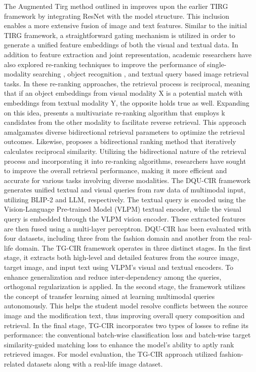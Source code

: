 \documentclass[10pt,lineno]{wlpeerj}
\begin{document}
\par The Augmented Tirg method outlined in \citep{aug-tirg} improves upon the earlier TIRG framework \citep{Nam} by integrating ResNet with the model structure. This inclusion enables a more extensive fusion of image and text features. Similar to the initial TIRG framework, a straightforward gating mechanism is utilized in order to generate a unified feature embeddings of both the visual and textual data. In addition to feature extraction and joint representation, academic researchers have also explored re-ranking techniques to improve the performance of single-modality searching \citep{SMR-1, SMR-2, SMR-3, SMR-4}, object recognition \citep{OR-1, OR-2}, and textual query based image retrieval \citep{TQ-1, TQ-2, TQ-3} tasks. In these re-ranking approaches, the retrieval process is reciprocal, meaning that if an object embeddings from visual modality X is a potential match with embeddings from textual modality Y, the opposite holds true as well. Expanding on this idea, \citep{RR} presents a multivariate re-ranking algorithm that employs k candidates from the other modality to facilitate reverse retrieval. This approach amalgamates diverse bidirectional retrieval parameters to optimize the retrieval outcomes. Likewise, \citep{SMR-2} proposes a bidirectional ranking method that iteratively calculates reciprocal similarity. Utilizing the bidirectional nature of the retrieval process and incorporating it into re-ranking algorithms, researchers have sought to improve the overall retrieval performance, making it more efficient and accurate for various tasks involving diverse modalities. The DQU-CIR \cite{DQU_CIR_Rev2} framework generates unified textual and visual queries from raw data of multimodal input, utilizing BLIP-2 and LLM, respectively. The textual query is encoded using the Vision-Language Pre-trained Model (VLPM) textual encoder, while the visual query is embedded through the VLPM vision encoder. These extracted features are then fused using a multi-layer perceptron. DQU-CIR has been evaluated with four datasets, including three from the fashion domain and another from the real-life domain. The TG-CIR \cite{TG_CIR_Rev3} framework operates in three distinct stages. In the first stage, it extracts both high-level and detailed features from the source image, target image, and input text using VLPM's visual and textual encoders. To enhance generalization and reduce inter-dependency among the queries, orthogonal regularization is applied. In the second stage, the framework utilizes the concept of transfer learning aimed at learning multimodal queries autonomously. This helps the student model resolve conflicts between the source image and the modification text, thus improving overall query composition and retrieval. In the final stage, TG-CIR incorporates two types of losses to refine its performance: the conventional batch-wise classification loss and batch-wise target similarity-guided matching loss to enhance the model's ability to aptly rank retrieved images. For model evaluation, the TG-CIR approach utilized fashion-related datasets along with a real-life image dataset.
\end{document}
